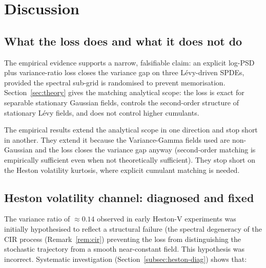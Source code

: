 \documentclass[review,12pt]{elsarticle}
\begin{document}
\section{Discussion}
\label{sec:discussion}

\subsection{What the loss does and what it does not do}

The empirical evidence supports a narrow, falsifiable claim: an
explicit log-PSD plus variance-ratio loss closes the variance gap
on three L\'evy-driven SPDEs, provided the spectral sub-grid is
randomised to prevent memorisation. Section~\ref{sec:theory} gives
the matching analytical scope: the loss is exact for separable
stationary Gaussian fields, controls the second-order structure of
stationary L\'evy fields, and does not control higher cumulants.

The empirical results extend the analytical scope in one direction
and stop short in another. They extend it because the
Variance-Gamma fields used are non-Gaussian and the loss closes
the variance gap anyway (second-order matching is empirically
sufficient even when not theoretically sufficient). They stop
short on the Heston volatility kurtosis, where explicit cumulant
matching is needed.

\subsection{Heston volatility channel: diagnosed and fixed}

The variance ratio of \(\approx 0.14\) observed in early Heston-V
experiments was initially hypothesised to reflect a structural
failure (the spectral degeneracy of the CIR process
(Remark~\ref{rem:cir}) preventing the loss from distinguishing
the stochastic trajectory from a smooth near-constant field. This
hypothesis was incorrect. Systematic investigation
(Section~\ref{subsec:heston-diag}) shows that:
\end{document}
